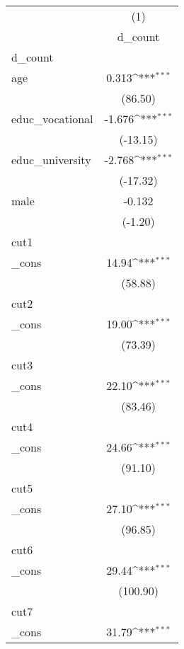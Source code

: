{
\def\sym#1{\ifmmode^{#1}\else\(^{#1}\)\fi}
\begin{tabular}{l*{1}{c}}
\hline\hline
            &\multicolumn{1}{c}{(1)}\\
            &\multicolumn{1}{c}{d\_count}\\
\hline
d\_count     &                     \\
age         &       0.313\sym{***}\\
            &     (86.50)         \\
[1em]
educ\_vocational&      -1.676\sym{***}\\
            &    (-13.15)         \\
[1em]
educ\_university&      -2.768\sym{***}\\
            &    (-17.32)         \\
[1em]
male        &      -0.132         \\
            &     (-1.20)         \\
\hline
cut1        &                     \\
\_cons      &       14.94\sym{***}\\
            &     (58.88)         \\
\hline
cut2        &                     \\
\_cons      &       19.00\sym{***}\\
            &     (73.39)         \\
\hline
cut3        &                     \\
\_cons      &       22.10\sym{***}\\
            &     (83.46)         \\
\hline
cut4        &                     \\
\_cons      &       24.66\sym{***}\\
            &     (91.10)         \\
\hline
cut5        &                     \\
\_cons      &       27.10\sym{***}\\
            &     (96.85)         \\
\hline
cut6        &                     \\
\_cons      &       29.44\sym{***}\\
            &    (100.90)         \\
\hline
cut7        &                     \\
\_cons      &       31.79\sym{***}\\

\end{tabular}}
